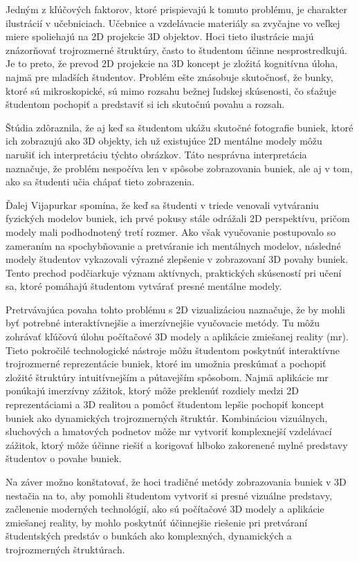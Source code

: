 Jedným z kľúčových faktorov, ktoré prispievajú k tomuto problému, je charakter ilustrácií v učebniciach. Učebnice a vzdelávacie materiály sa zvyčajne vo veľkej miere spoliehajú na 2D 
projekcie 3D objektov. Hoci tieto ilustrácie majú znázorňovať trojrozmerné štruktúry, často to študentom účinne nesprostredkujú. Je to preto, že prevod 2D projekcie na 3D koncept je 
zložitá kognitívna úloha, najmä pre mladších študentov. Problém ešte znásobuje skutočnosť, že bunky, ktoré sú mikroskopické, sú mimo rozsahu bežnej ľudskej skúsenosti, čo sťažuje študentom 
pochopiť a predstaviť si ich skutočnú povahu a rozsah.

Štúdia zdôraznila, že aj keď sa študentom ukážu skutočné fotografie buniek, ktoré ich zobrazujú ako 3D objekty, ich už existujúce 2D mentálne modely môžu narušiť ich interpretáciu týchto 
obrázkov. Táto nesprávna interpretácia naznačuje, že problém nespočíva len v spôsobe zobrazovania buniek, ale aj v tom, ako sa študenti učia chápať tieto zobrazenia.

Ďalej Vijapurkar spomína, že keď sa študenti v triede venovali vytváraniu fyzických modelov buniek, ich prvé pokusy stále odrážali 2D perspektívu, pričom modely mali podhodnotený 
tretí rozmer. Ako však vyučovanie postupovalo so zameraním na spochybňovanie a pretváranie ich mentálnych modelov, následné modely študentov vykazovali výrazné zlepšenie v zobrazovaní 
3D povahy buniek. Tento prechod podčiarkuje význam aktívnych, praktických skúseností pri učení sa, ktoré pomáhajú študentom vytvárať presné mentálne modely.

Pretrvávajúca povaha tohto problému s 2D vizualizáciou naznačuje, že by mohli byť potrebné interaktívnejšie a imerzívnejšie vyučovacie metódy. Tu môžu zohrávať kľúčovú úlohu počítačové 
3D modely a aplikácie zmiešanej reality (\acrshort{mr}). Tieto pokročilé technologické nástroje môžu študentom poskytnúť interaktívne trojrozmerné reprezentácie buniek, ktoré im umožnia preskúmať a 
pochopiť zložité štruktúry intuitívnejším a pútavejším spôsobom. Najmä aplikácie \acrshort{mr} ponúkajú imerzívny zážitok, ktorý môže preklenúť rozdiely medzi 2D reprezentáciami a 3D realitou a pomôcť 
študentom lepšie pochopiť koncept buniek ako dynamických trojrozmerných štruktúr. Kombináciou vizuálnych, sluchových a hmatových podnetov môže \acrshort{mr} vytvoriť komplexnejší vzdelávací zážitok, 
ktorý môže účinne riešiť a korigovať hlboko zakorenené mylné predstavy študentov o povahe buniek.

Na záver možno konštatovať, že hoci tradičné metódy zobrazovania buniek v 3D nestačia na to, aby pomohli študentom vytvoriť si presné vizuálne predstavy, začlenenie moderných technológií, 
ako sú počítačové 3D modely a aplikácie zmiešanej reality, by mohlo poskytnúť účinnejšie riešenie pri pretváraní študentských predstáv o bunkách ako komplexných, dynamických a trojrozmerných štruktúrach.

